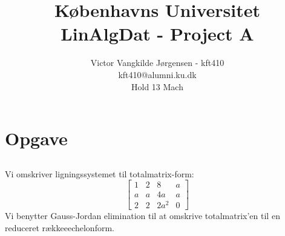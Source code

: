 \documentclass[a4paper,12pt]{article}
\title{Københavns Universitet\\
LinAlgDat - Project A}
\author{Victor Vangkilde Jørgensen - kft410\\ 
kft410@alumni.ku.dk\\
Hold 13 Mach}
\begin{document}
 

\maketitle 

\section[Opgave]{Opgave}
\subsection{}
Vi omskriver ligningssystemet til totalmatrix-form:
\[
\left[\begin{array}{ccc|c}
    1 & 2 & 8 & a \\
    a & a & 4a & a \\
    2 & 2 & 2a^2 & 0
\end{array}\right]
\]
Vi benytter Gauss-Jordan elimination til at omskrive totalmatrix'en til en reduceret rækkeeechelonform.\\
\end{document}
